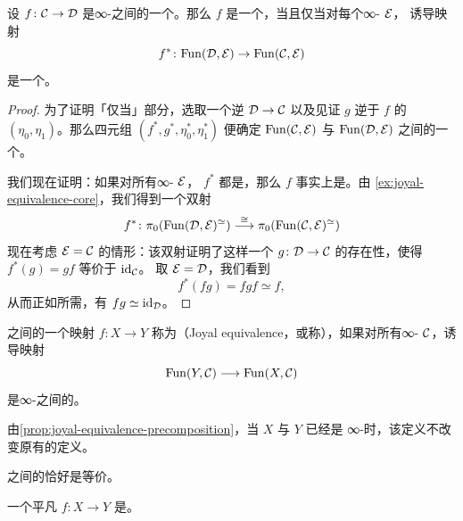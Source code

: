\begin{proposition}\label{prop:joyal-equivalence-precomposition}
设 $f\colon \mathcal{C} \to \mathcal{D}$ 是∞-\trCategories{}之间的一个\trFunctor{}。那么 $f$
是一个\trJoyalEquivalence{}，当且仅当对每个∞-\trCategory{} $\mathcal{E}$，
诱导映射
\[
f^*\colon \mathrm{Fun}(\mathcal{D}, \mathcal{E}) \to \mathrm{Fun}(\mathcal{C}, \mathcal{E})
\]
是一个\trJoyalEquivalence{}。
\end{proposition}

\begin{proof}
为了证明「仅当」部分，选取一个逆 $\mathcal{D} \to \mathcal{C}$ 以及见证 $g$ 逆于 $f$ 的%
\trNaturalTransformation{} $(\eta_0, \eta_1)$。那么四元组
$(f^*, g^*, \eta_0^*, \eta_1^*)$ 便确定 $\mathrm{Fun}(\mathcal{C}, \mathcal{E})$ 与
$\mathrm{Fun}(\mathcal{D}, \mathcal{E})$ 之间的一个\trEquivalence{}。

我们现在证明：如果对所有∞-\trCategories{} $\mathcal{E}$，\trFunctor{} $f^*$
都是\trJoyalEquivalence{}，那么 $f$ 事实上是\trJoyalEquivalence{}。由
\cref{ex:joyal-equivalence-core}，我们得到一个双射
\[
f^*\colon \pi_0(\mathrm{Fun}(\mathcal{D}, \mathcal{E})^{\simeq})
\stackrel{\cong}{\longrightarrow} \pi_0(\mathrm{Fun}(\mathcal{C}, \mathcal{E})^{\simeq})
\]
现在考虑 $\mathcal{E} = \mathcal{C}$ 的情形：该双射证明了这样一个\trFunctor{}%
$g\colon \mathcal{D} \to \mathcal{C}$ 的存在性，使得 $f^*(g) = gf$ 等价于 $\mathrm{id}_{\mathcal{C}}$。
取 $\mathcal{E} = \mathcal{D}$，我们看到
\[
f^*(fg) = fgf \simeq f,
\]
从而正如所需，有 $fg \simeq \mathrm{id}_{\mathcal{D}}$。
\end{proof}

\begin{definition}\label{def:joyal-equivalence-simplicial-sets}
\trSimplicialSets{}之间的一个映射 $f\colon X \to Y$ 称为\emph{\trJoyalEquivalence{}}（Joyal equivalence，或称\trCategoricalEquivalence{}），如果对所有∞-\trCategories{} $\mathcal{C}$，诱导映射
\[
\mathrm{Fun}(Y, \mathcal{C}) \longrightarrow \mathrm{Fun}(X, \mathcal{C})
\]
是∞-\trCategories{}之间的\trJoyalEquivalence{}。
\end{definition}

\begin{observation}\label{obs:joyal-equivalence-unchanged}
由\cref{prop:joyal-equivalence-precomposition}，当 $X$ 与 $Y$ 已经是
∞-\trCategories{}时，该定义不改变原有的定义。
\end{observation}

\begin{observation}\label{obs:joyal-equivalence-kan-homotopy}
\trKanComplex{}之间的\trJoyalEquivalence{}恰好是\trHomotopy{}等价。
\end{observation}

\begin{proposition}\label{prop:trivial-kan-fibration-joyal-equivalence}
一个平凡\trKanFibration{} $f\colon X \to Y$ 是\trJoyalEquivalence{}。
\end{proposition}

